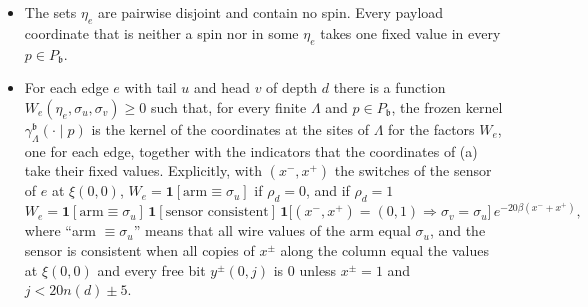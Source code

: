 \begin{lemma}[Factorization]\label{pay:factor}
\begin{itemize}
\item[(a)] The sets $\eta_e$ are pairwise disjoint and contain no spin. Every payload coordinate that is neither a spin nor in some $\eta_e$ takes one fixed value in every $p\in P_{\mathfrak b}$.
\item[(b)] For each edge $e$ with tail $u$ and head $v$ of depth $d$ there is a function $W_e(\eta_e,\sigma_u,\sigma_v)\ge0$ such that, for every finite $\Lambda$ and $p\in P_{\mathfrak b}$, the frozen kernel $\gamma^{\mathfrak b}_\Lambda(\cdot\mid p)$ is the kernel of the coordinates at the sites of $\Lambda$ for the factors $W_e$, one for each edge, together with the indicators that the coordinates of (a) take their fixed values. Explicitly, with $(x^-,x^+)$ the switches of the sensor of $e$ at $\xi(0,0)$,
$W_e=\mathbf 1[\text{arm}\equiv\sigma_u]$ if $\rho_d=0$, and if $\rho_d=1$
\[
W_e=\mathbf 1[\text{arm}\equiv\sigma_u]\,\mathbf 1[\text{sensor consistent}]\,\mathbf 1\bigl[(x^-,x^+)=(0,1)\Rightarrow\sigma_v=\sigma_u\bigr]\,e^{-20\beta(x^-+x^+)},
\]
where ``arm $\equiv\sigma_u$'' means that all wire values of the arm equal $\sigma_u$, and the sensor is consistent when all copies of $x^\pm$ along the column equal the values at $\xi(0,0)$ and every free bit $y^\pm(0,j)$ is $0$ unless $x^\pm=1$ and $j<20n(d)\pm5$.
\end{itemize}
\end{lemma}

